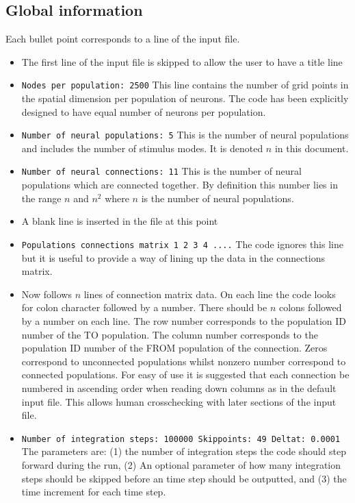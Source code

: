 \documentclass[12pt,a4paper]{article}
\begin{document}
\subsection{Global information}
Each bullet point corresponds to a line of the input file.
\begin{itemize}
\item The first line of the input file is skipped to allow the user to have a title
line
\item {\tt \small \small Nodes per population: 2500} This line contains the number of grid points
in the spatial dimension per population of neurons. The code has been
explicitly designed to have equal number of neurons per population.
\item {\tt \small Number of neural populations: 5} This is the number of neural
populations and includes the number of stimulus modes. It is denoted
$n$ in this document.
\item {\tt \small Number of neural connections: 11} This is the number of neural
populations which are connected together. By definition this number lies in the
range $n$ and $n^2$ where $n$ is the number of neural populations.
\item A blank line is inserted in the file at this point
\item {\tt \small Populations connections matrix 1 2 3 4 ....} The code ignores this
line but it is useful to provide a way of lining up the data in the
connections matrix.
\item Now follows $n$ lines of connection matrix data. On each line the code
looks for colon character followed by a number. There should be $n$ colons
followed by a number on each line. The row number corresponds to the
population ID number of the TO population. The column number corresponds 
to the population ID number of the FROM population of the connection. Zeros
correspond to unconnected populations whilst nonzero number correspond
to connected populations. For easy of use it is suggested that each connection
be numbered in ascending order when reading down columns
as in the default input file. This allows
human crosschecking with later sections of the input file.
\item {\tt \small Number of integration steps: 100000 Skippoints: 49 Deltat: 0.0001}
The parameters are: 
(1) the number of integration steps the code should step forward
during the
run, (2) An optional parameter of how many integration steps should
be skipped before an time step should be outputted, and
(3) the time increment for each time step.


\end{itemize}
\end{document}
